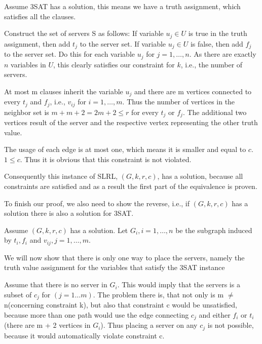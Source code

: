 \documentclass [12pt]{article}
\begin{document}
\noindent
  Assume 3SAT has a solution, this means we have a truth assignment, 
    which satisfies all the clauses.
\medskip

\noindent
  Construct the set of servers S as follows: If variable $u_j \in U$ is true
      in the truth assignment, then add $t_j$ to the server set. If variable $u_j \in U$
      is false, then add $f_j$ to the server set. Do this for each variable $u_j$ for $j = 1,\dots,n$.
      As there are exactly $n$ variables in $U$, this clearly satisfies our constraint 
    for $k$, i.e., the number of servers.
\medskip

\noindent
  At most m clauses inherit the variable $u_j$ and there are m vertices connected to every
      $t_j$ and $f_j$, i.e., $v_{ij}$ for $i=1,\dots,m$.
      Thus the number of vertices in the neighbor set is $m+m+2 = 2m+2 \leq r $ for every 
      $t_j$ or $f_j$. The additional two vertices result of the server and the respective 
    vertex representing the other truth value.
\medskip

\noindent
  The usage of each edge is at most one, which means it is smaller and equal to $c$. $1\leq c$.
    Thus it is obvious that this constraint is not violated.
\medskip

\noindent
  Consequently this instance of SLRL, $(G,k,r,c)$, has a solution, because all constraints are satisfied 
    and as a result the first part of the equivalence is proven.
\medskip

\noindent
To finish our proof, we also need to show the reverse, i.e., 
if $(G,k,r,c)$ has a solution there is also a solution for 3SAT. 
  \medskip

  \noindent
  Assume $(G,k,r,c)$ has a solution. Let $G_i, i=1,\dots,n$ be the subgraph induced
    by $t_i, f_i$ and $v_{ij},j=1,\dots,m$.
  \medskip

  \noindent
  We will now show that there is only one way to place the servers, namely the truth
    value assignment for the variables that satisfy the 3SAT instance
  \medskip

  \noindent
  Assume that there is no server in $G_i$. This would imply that the servers is a subset of
      $c_j$ for $(j=1\dots m)$. The problem there is, that not only is m $\neq$ n(concerning constraint k),
      but also that constraint c would be unsatisfied, because more than one path would use 
      the edge connecting $c_j$ and either $f_i$ or $t_i$ (there are m + 2 vertices in $G_i$).
    Thus placing a server on any $c_j$ is not possible, because it would automatically violate constraint c.
  \medskip
\end{document}
